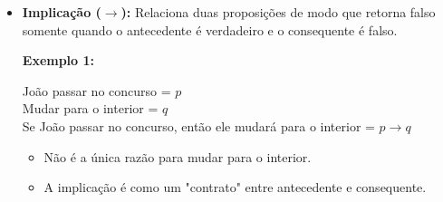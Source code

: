 \begin{itemize}[left=0.5cm, align=left, nosep]
                    \textbf{Exemplo:}      
                    \begin{center}
                        João é médico = $p$ \\
                        Pedro é advogado = $q$ \\
                        João é médico ou Pedro é advogado = $p \lor q$
                    \end{center}
                
                    \begin{itemize}[left=0.5cm, nosep, label=$\hookrightarrow$]
                        \item A disjunção é comutativa e não excludente: $p \lor q \equiv q \lor p$.
                        \item Nem sempre é excludente no português:
                        \begin{enumerate}[label=\arabic*., left=0.5cm, align=left, nosep]
                            \item Pedro está em Fortaleza ou Porto Alegre.
                        \end{enumerate}
                    \end{itemize}

                \vspace{0.5cm}
                \item \textbf{Implicação ($\rightarrow$):} Relaciona duas proposições de modo que retorna falso somente quando o antecedente é verdadeiro e o consequente é falso.
                
                    \textbf{Exemplo 1:}      
                    \begin{center}
                        João passar no concurso = $p$ \\
                        Mudar para o interior = $q$ \\
                        Se João passar no concurso, então ele mudará para o interior = $p \rightarrow q$
                    \end{center}
                
                    \begin{itemize}[left=0.5cm, nosep, label=$\hookrightarrow$]
                        \item Não é a única razão para mudar para o interior. 
                        \item A implicação é como um "contrato" entre antecedente e consequente.
                    \end{itemize}
                

\end{itemize}
